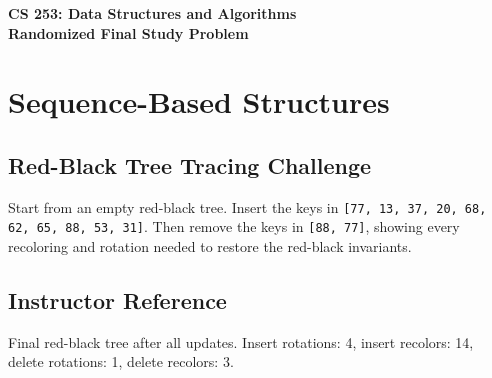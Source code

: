\documentclass[11pt]{article}
\begin{document}
\begin{center}
    \Large\textbf{CS 253: Data Structures and Algorithms}\\
    \large\textbf{Randomized Final Study Problem}
\end{center}
\vspace{1em}


\section*{Sequence-Based Structures}
\subsection*{Red-Black Tree Tracing Challenge}
Start from an empty red-black tree. Insert the keys in \texttt{[77, 13, 37, 20, 68, 62, 65, 88, 53, 31]}. Then remove the keys in \texttt{[88, 77]}, showing every recoloring and rotation needed to restore the red-black invariants.

\subsection*{Instructor Reference}
Final red-black tree after all updates. Insert rotations: 4, insert recolors: 14, delete rotations: 1, delete recolors: 3.
\begin{center}
\end{center}
\end{document}
